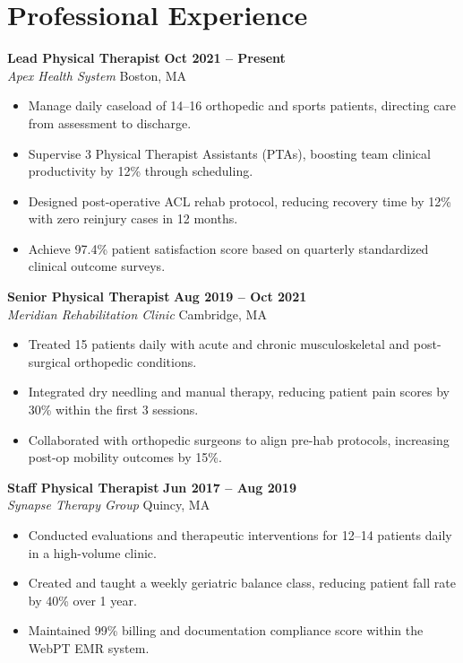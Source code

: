 \documentclass[10pt,letterpaper]{article}
\begin{document}
\section*{Professional Experience}

\noindent
\textbf{Lead Physical Therapist} \hfill \textbf{Oct 2021 -- Present} \\
\textit{Apex Health System} \hfill Boston, MA
\begin{itemize}[leftmargin=1.2em, topsep=1pt, itemsep=1pt, parsep=0pt]
    \item Manage daily caseload of 14--16 orthopedic and sports patients, directing care from assessment to discharge.
    \item Supervise 3 Physical Therapist Assistants (PTAs), boosting team clinical productivity by 12\% through scheduling.
    \item Designed post-operative ACL rehab protocol, reducing recovery time by 12\% with zero reinjury cases in 12 months.
    \item Achieve 97.4\% patient satisfaction score based on quarterly standardized clinical outcome surveys.
\end{itemize}

\vspace{0.4em}
\noindent
\textbf{Senior Physical Therapist} \hfill \textbf{Aug 2019 -- Oct 2021} \\
\textit{Meridian Rehabilitation Clinic} \hfill Cambridge, MA
\begin{itemize}[leftmargin=1.2em, topsep=1pt, itemsep=1pt, parsep=0pt]
    \item Treated 15 patients daily with acute and chronic musculoskeletal and post-surgical orthopedic conditions.
    \item Integrated dry needling and manual therapy, reducing patient pain scores by 30\% within the first 3 sessions.
    \item Collaborated with orthopedic surgeons to align pre-hab protocols, increasing post-op mobility outcomes by 15\%.
\end{itemize}

\vspace{0.4em}
\noindent
\textbf{Staff Physical Therapist} \hfill \textbf{Jun 2017 -- Aug 2019} \\
\textit{Synapse Therapy Group} \hfill Quincy, MA
\begin{itemize}[leftmargin=1.2em, topsep=1pt, itemsep=1pt, parsep=0pt]
    \item Conducted evaluations and therapeutic interventions for 12--14 patients daily in a high-volume clinic.
    \item Created and taught a weekly geriatric balance class, reducing patient fall rate by 40\% over 1 year.
    \item Maintained 99\% billing and documentation compliance score within the WebPT EMR system.
\end{itemize}
\end{document}

